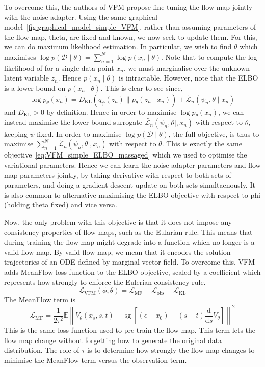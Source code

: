 \documentclass[12pt,a4paper]{report}
\begin{document}
To overcome this, the authors of VFM propose fine-tuning the flow map jointly with the noise adapter. 
Using the same graphical model~\ref{fig:graphical_model_simple_VFM}, rather than assuming parameters of the flow map, theta, are fixed and known, we now seek to update them. 
For this, we can do maximum likelihood estimation. 
In particular, we wish to find $\theta$ which maximises $\log p(\mathcal{D} \mid \theta) = \sum_{n=1}^N \log p(x_n \mid \theta)$.
Note that to compute the log likelihood of for a single data point $x_n$, we must marginalise over the unknown latent variable $z_n$. 
Hence $p(x_n \mid \theta)$ is intractable. 
However, note that the ELBO is a lower bound on $p(x_n \mid \theta)$. This is clear to see since, 
\begin{equation}
\log p_\theta(x_n) = D_{\text{KL}}(q_\psi(z_n) \parallel p_\theta(z_n \mid x_n)) + \tilde{\mathcal{L}_n}(\psi_n, \theta \mid x_n) 
\end{equation}
and $D_{\text{KL}}>0$ by definition.
Hence in order to maximise $\log p_\theta(x_n)$, we can instead maximise the lower bound surrogate $\tilde{\mathcal{L}_n}(\psi_n, \theta \mid , x_n) $ with respect to $\theta$, keeping $\psi$ fixed. 
In order to maximise $\log p(\mathcal{D} \mid \theta) $, the full objective, is thus to maximise $\sum_{n=1}^N \tilde{\mathcal{L}_n}(\psi_n, \theta \mid , x_n) $ with respect to $\theta$. This is exactly the same objective~\ref{eq:VFM_simple_ELBO_massaged} which we used to optimise the variational parameters. 
Hence we can learn the noise adapter parameters and flow map parameters jointly, by taking derivative with respect to both sets of parameters, and doing a gradient descent update on both sets simultaenously. It is also common to alternative maximising the ELBO objective with respect to phi (holding theta fixed) and vice versa. 

Now, the only problem with this objective is that it does not impose any consistency properties of flow maps, such as the Eularian rule. 
This means that during training the flow map might degrade into a function which no longer is a valid flow map. 
By valid flow map, we mean that it encodes the solution trajectories of an ODE defined by marginal vector field. 
To overcome this, VFM adds MeanFlow loss function to the ELBO objective, scaled by a coefficient which represents how strongly to enforce the Eulerian consistency rule. 
\begin{equation}
    \label{eq:VFM_training_loss}
    \mathcal{L}_{\text{VFM}}(\phi, \theta) = \mathcal{L}_{\text{MF}} + \mathcal{L}_{\text{obs}} + \mathcal{L}_{\text{KL}}
\end{equation}
The MeanFlow term is 
$$ \mathcal{L}_{\text{MF}} = \frac{1}{2\tau^2} \mathbb{E} \left\| V_\theta(x_s, s, t) - \operatorname{sg}\left[ (\epsilon - x_0) - (s - t)\frac{\mathrm{d}}{\mathrm{d}s} V_\theta \right] \right\|^2 $$
This is the same loss function used to pre-train the flow map. This term lets the flow map change without forgetting how to generate the original data distribution. The role of $\tau$ is to determine how strongly the flow map changes to minimise the MeanFlow term versus the observation term. 
\end{document}
